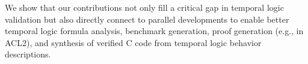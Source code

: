 \documentclass[runningheads]{llncs}
\begin{document}
We show that our contributions not only fill a critical gap in temporal logic validation but also directly connect to parallel developments to enable better temporal logic formula analysis, benchmark generation, proof generation (e.g., in ACL2), and synthesis of verified C code from temporal logic behavior descriptions. 


\end{document}
